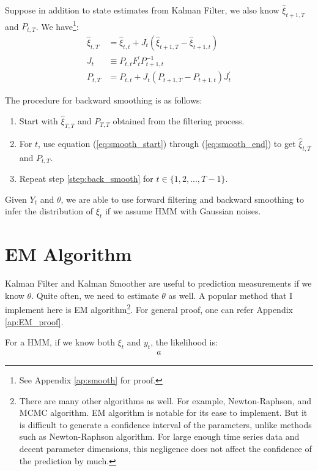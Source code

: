 \documentclass[12pt]{article}
\newenvironment{boenumerate}
    {\begin{enumerate}\renewcommand\labelenumi{\textbf\theenumi}}
    {\end{enumerate}}
\numberwithin{equation}{section}
\begin{document}
Suppose in addition to state estimates from Kalman Filter, we also know $\hat{\xi}_{t+1,T}$ and $P_{t,T}$. We have\footnote{See Appendix \ref{ap:smooth} for proof.}:
\begin{align}
    \hat{\xi}_{t,T} &= \hat{\xi}_{t,t} + J_t(\hat{\xi}_{t+1,T}-\hat{\xi}_{t+1,t}) \label{eq:smooth_start} \\
    J_t & \equiv P_{t,t}F_t^{'}P_{t+1,t}^{-1} \\
    P_{t,T} &= P_{t,t} + J_t(P_{t+1,T}-P_{t+1,t})J_t^{'} \label{eq:smooth_end}
\end{align}

The procedure for backward smoothing is as follows:
\begin{boenumerate}
    \item Start with $\hat{\xi}_{T,T}$ and $P_{T,T}$ obtained from the filtering process.
    \item \label{step:back_smooth} For $t$, use equation (\ref{eq:smooth_start}) through (\ref{eq:smooth_end}) to get $\hat{\xi}_{t,T}$ and $P_{t,T}$.
    \item Repeat step \ref{step:back_smooth} for $t \in \{1,2,...,T-1\}$.
\end{boenumerate}

Given $Y_t$ and $\theta$, we are able to use forward filtering and backward smoothing to infer the distribution of $\xi_t$ if we assume HMM with Gaussian noises. 

\section{EM Algorithm} \label{sec:EM}
Kalman Filter and Kalman Smoother are useful to prediction measurements if we know $\theta$. Quite often, we need to estimate $\theta$ as well. A popular method that I implement here is EM algorithm\footnote{There are many other algorithms as well. For example, Newton-Raphson, and MCMC algorithm. EM algorithm is notable for its ease to implement. But it is difficult to generate a confidence interval of the parameters, unlike methods such as Newton-Raphson algorithm. For large enough time series data and decent parameter dimensions, this negligence does not affect the confidence of the prediction by much.}. For general proof, one can refer Appendix \ref{ap:EM_proof}.

For a HMM, if we know both $\xi_t$ and $y_t$, the likelihood is: 
\begin{align}
    a
\end{align}
\end{document}
